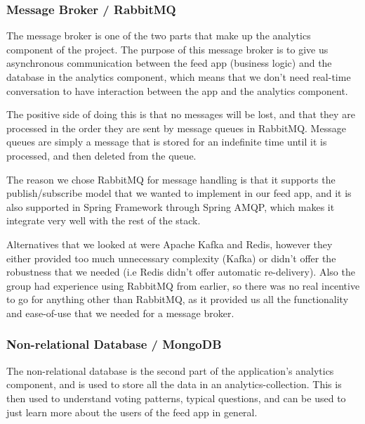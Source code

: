 \subsubsection{Message Broker / RabbitMQ}
The message broker is one of the two parts that make up the analytics component of the project. The purpose of this message broker is to give us asynchronous communication between the feed app (business logic) and the database in the analytics component, which means that we don’t need real-time conversation to have interaction between the app and the analytics component. 

The positive side of doing this is that no messages will be lost, and that they are processed in the order they are sent by message queues in RabbitMQ. Message queues are simply a message that is stored for an indefinite time until it is processed, and then deleted from the queue.

The reason we chose RabbitMQ for message handling is that it supports the publish/subscribe model that we wanted to implement in our feed app, and it is also supported in Spring Framework through Spring AMQP, which makes it integrate very well with the rest of the stack.

Alternatives that we looked at were Apache Kafka and Redis, however they either provided too much unnecessary complexity (Kafka) or didn't offer the robustness that we needed (i.e Redis didn’t offer automatic re-delivery). Also the group had experience using RabbitMQ from earlier, so there was no real incentive to go for anything other than RabbitMQ, as it provided us all the functionality and ease-of-use that we needed for a message broker.

\subsubsection{Non-relational Database / MongoDB}
The non-relational database is the second part of the application’s analytics component, and is used to store all the data in an analytics-collection. This is then used to understand voting patterns, typical questions, and can be used to just learn more about the users of the feed app in general.

